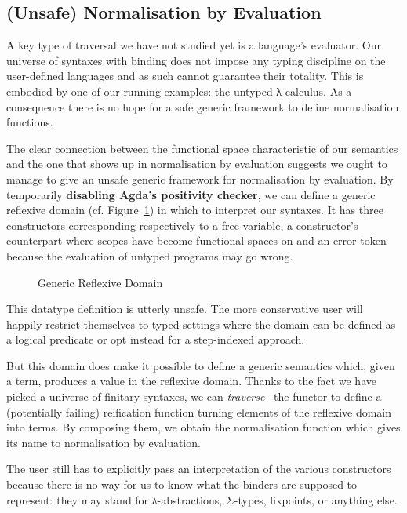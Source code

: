 \subsection{(Unsafe) Normalisation by Evaluation}\label{section:nbyeval}

A key type of traversal we have not studied yet is a language's
evaluator. Our universe of syntaxes with binding does not impose
any typing discipline on the user-defined languages and as such
cannot guarantee their totality. This is embodied by one of our running
examples: the untyped λ-calculus. As a consequence there
is no hope for a safe generic framework to define normalisation
functions.

The clear connection between the  functional space
characteristic of our semantics and the one that shows up in
normalisation by evaluation suggests we ought to manage to
give an unsafe generic framework for normalisation by evaluation.
By temporarily \textbf{disabling Agda's positivity checker},
we can define a generic reflexive domain 
(cf. Figure~\ref{fig:reflexivedomain}) in which to
interpret our syntaxes. It has three constructors corresponding
respectively to a free variable, a constructor's counterpart where
scopes have become  functional spaces on  and
an error token because the evaluation of untyped programs may go wrong.

\begin{figure}[h]
\caption{Generic Reflexive Domain}\label{fig:reflexivedomain}
\end{figure}

This datatype definition is utterly unsafe. The more conservative
user will happily restrict themselves to typed settings where the
domain can be defined as a logical predicate or opt instead for
a step-indexed approach.

But this domain does make it possible to define a generic 
semantics which, given a term, produces a value in the reflexive
domain. Thanks to the fact we have picked a universe of finitary syntaxes, we
can \emph{traverse}~\cite{mcbride_paterson_2008,DBLP:journals/jfp/GibbonsO09}
the functor to define
a (potentially failing) reification function turning elements of the
reflexive domain into terms. By composing them, we obtain the
normalisation function which gives its name to normalisation by
evaluation.

The user still has to explicitly pass an interpretation of
the various constructors because there is no way for us to
know what the binders are supposed to represent: they may
stand for λ-abstractions, $\Sigma$-types, fixpoints, or
anything else.

